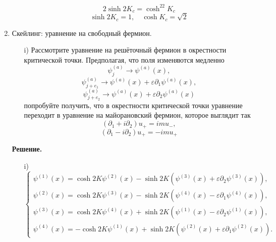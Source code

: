 \documentclass[12pt]{article}
\theoremstyle{definition}
\begin{document}
\begin{enumerate}
\begin{itemize}
\begin{equation}
        2\sinh2K_c=\cosh^22K_c
    \end{equation}
    \begin{equation}
        \boxed{\sinh2K_c=1,\quad \cosh K_c=\sqrt{2}}
    \end{equation}
\end{itemize}
\item Скейлинг: уравнение на свободный фермион.
\begin{itemize}
    \item[i)] Рассмотрите уравнение на решёточный фермион в окрестности критической точки. Предполагая, что поля изменяются медленно
    \begin{equation}
        \psi_j^{(a)}\rightarrow\psi^{(a)}(x),
    \end{equation}
    \begin{equation}
        \psi_{j+e_1}^{(a)}\rightarrow\psi^{(a)}(x)+\varepsilon\partial_1\psi^{(a)}(x),
    \end{equation}
    \begin{equation}
        \psi_{j+e_2}^{(a)}\rightarrow\psi^{(a)}(x)+\varepsilon\partial_2\psi^{(a)}(x)
    \end{equation}
    попробуйте получить, что в окрестности критической точки уравнение переходит в уравнение на майорановский фермион, которое выглядит так
    \begin{equation}
        (\partial_1+i\partial_2)u_+=imu_-,
    \end{equation}
    \begin{equation}
        (\partial_1-i\partial_2)u_+=-imu_+
    \end{equation}
\end{itemize}
\textbf{Решение.}
\begin{itemize}
    \item[i)] 
    \begin{equation}
        \begin{cases}
            \psi^{(1)}(x)=\cosh2K\psi^{(2)}(x)-\sinh2K(\psi^{(3)}(x)+\varepsilon\partial_2\psi^{(3)}(x)),\\
            \psi^{(2)}(x)=\cosh2K\psi^{(3)}(x)-\sinh2K(\psi^{(4)}(x)-\varepsilon\partial_1\psi^{(4)}(x)),\\
            \psi^{(3)}(x)=\cosh2K\psi^{(4)}(x)+\sinh2K(\psi^{(1)}(x)-\varepsilon\partial_2\psi^{(1)}(x)),\\
            \psi^{(4)}(x)=-\cosh2K\psi^{(1)}(x)+\sinh2K(\psi^{(2)}(x)+\varepsilon\partial_1\psi^{(2)}(x)).
        \end{cases}
    \end{equation}

\end{itemize}
\end{enumerate}
\end{document}
